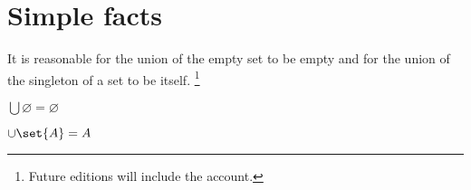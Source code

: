 \section*{Simple facts}

It is reasonable for the union of the empty set to be empty and for the union of the singleton of a set to be itself.
  \ifhmode\unskip\fi\footnote{
Future editions will include the account.
  }

\begin{proposition}
$\bigcup \varnothing = \varnothing$
\end{proposition}


\begin{proposition}
$\cup \set{A} = A$
\end{proposition}

